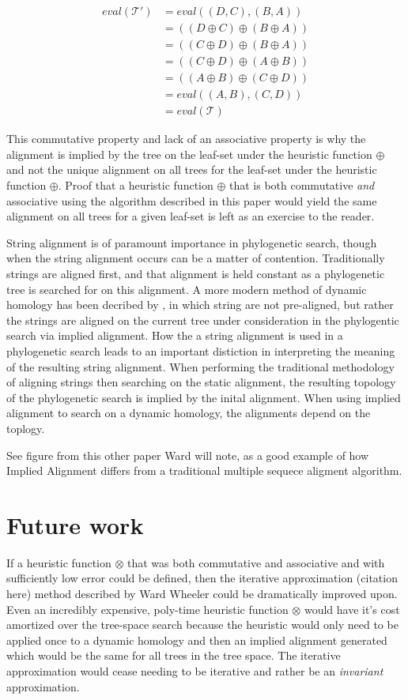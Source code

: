 \documentclass[11pt]{article}
\begin{document}
\begin{align*}
  eval(\mathcal{T'}) &= eval((D,C),(B,A))
\\  &= ((D \oplus C) \oplus (B \oplus A))
\\  &= ((C \oplus D) \oplus (B \oplus A))
\\  &= ((C \oplus D) \oplus (A \oplus B))
\\  &= ((A \oplus B) \oplus (C \oplus D))
\\  &= eval((A,B),(C,D))
\\  &= eval(\mathcal{T})
\end{align*}

This commutative property and lack of an associative property is why the alignment is implied by the tree on the leaf-set under the heuristic function $\oplus$ and not the unique alignment on all trees for the leaf-set under the heuristic function $\oplus$. 
Proof that a heuristic function $\oplus$ that is both commutative \emph{and} associative using the algorithm described in this paper would yield the same alignment on all trees for a given leaf-set is left as an exercise to the reader.

String alignment is of paramount importance in phylogenetic search, though when the string alignment occurs can be a matter of contention.
Traditionally strings are aligned first, and that alignment is held constant as a phylogenetic tree is searched for on this alignment.
A more modern method of dynamic homology has been decribed by \citep{Wheeler1996}, in which string are not pre-aligned, but rather the strings are aligned on the current tree under consideration in the phylogentic search via implied alignment.
How the a string alignment is used in a phylogenetic search leads to an important distiction in interpreting the meaning of the resulting string alignment.
When performing the traditional methodology of aligning strings then searching on the static alignment, the resulting topology of the phylogenetic search is implied by the inital alignment.
When using implied alignment to search on a dynamic homology, the alignments depend on the toplogy.

See figure from this other paper Ward will note, as a good example of how Implied Alignment differs from a traditional multiple sequece aligment algorithm.


\section{Future work}
If a heuristic function $\otimes$ that was both commutative and associative and with sufficiently low error could be defined, then the iterative approximation (citation here) method described by Ward Wheeler could be dramatically improved upon. 
Even an incredibly expensive, poly-time heuristic function $\otimes$ would have it's cost amortized over the tree-space search because the heuristic would only need to be applied once to a dynamic homology and then an implied alignment generated which would be the same for all trees in the tree space. 
The iterative approximation would cease needing to be iterative and rather be an \emph{invariant} approximation.
\end{document}
